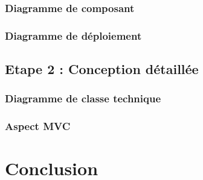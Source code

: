\documentclass[a4paper,table]{article}
\begin{document}
\subsubsection{Diagramme de composant}

\subsubsection{Diagramme de déploiement}

\subsection{Etape 2 : Conception détaillée}

\subsubsection{Diagramme de classe technique}

\subsubsection{Aspect MVC}

\newpage

\section*{Conclusion}
\end{document}
